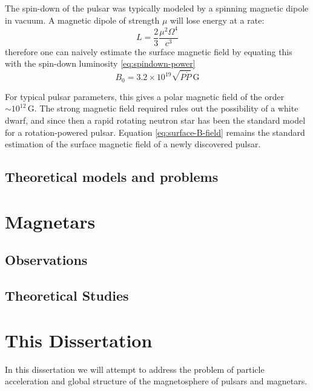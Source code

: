 The spin-down of the pulsar was typically modeled by a spinning magnetic dipole
in vacuum. A magnetic dipole of strength $\mu$ will lose energy at a rate:
\begin{equation}
  \label{eq:dipole-spin-down}
  L = \frac{2}{3}\frac{\mu^2\Omega^4}{c^3}
\end{equation}
therefore one can naively estimate the surface magnetic field by equating this
with the spin-down luminosity \eqref{eq:spindown-power}
\begin{equation}
  \label{eq:surface-B-field}
  B_0 = 3.2\times 10^{19}\sqrt{P \dot{P}}\,\mathrm{G}
\end{equation}

For typical pulsar parameters, this gives a polar magnetic field of the order
$\sim 10^{12}\,\mathrm{G}$. The strong magnetic field required rules out the
possibility of a white dwarf, and since then a rapid rotating neutron star has
been the standard model for a rotation-powered pulsar. Equation
\eqref{eq:surface-B-field} remains the standard estimation of the surface
magnetic field of a newly discovered pulsar.




\subsection{Theoretical models and problems}


\section{Magnetars}
\label{sec:intro-magnetars}

\subsection{Observations}

\subsection{Theoretical Studies}


\section{This Dissertation}
\label{sec:intro-outline}

In this dissertation we will attempt to address the problem of particle
acceleration and global structure of the magnetosphere of pulsars and
magnetars.

